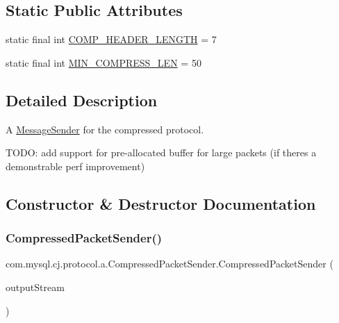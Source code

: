 \subsection*{Static Public Attributes}
\begin{DoxyCompactItemize}
\item 
static final int \mbox{\hyperlink{classcom_1_1mysql_1_1cj_1_1protocol_1_1a_1_1_compressed_packet_sender_af23eba021b7b5002ef05f27bba7733e8}{C\+O\+M\+P\+\_\+\+H\+E\+A\+D\+E\+R\+\_\+\+L\+E\+N\+G\+TH}} = 7
\item 
static final int \mbox{\hyperlink{classcom_1_1mysql_1_1cj_1_1protocol_1_1a_1_1_compressed_packet_sender_a5db21027c99a6cb911a6a286d291a326}{M\+I\+N\+\_\+\+C\+O\+M\+P\+R\+E\+S\+S\+\_\+\+L\+EN}} = 50
\end{DoxyCompactItemize}


\subsection{Detailed Description}
A \mbox{\hyperlink{interfacecom_1_1mysql_1_1cj_1_1protocol_1_1_message_sender}{Message\+Sender}} for the compressed protocol.

T\+O\+DO\+: add support for pre-\/allocated buffer for large packets (if there\textquotesingle{}s a demonstrable perf improvement) 

\subsection{Constructor \& Destructor Documentation}
\mbox{\label{classcom_1_1mysql_1_1cj_1_1protocol_1_1a_1_1_compressed_packet_sender_ab6d47e91936124c65c9c980ed73af907}} 
\subsubsection{\texorpdfstring{Compressed\+Packet\+Sender()}{CompressedPacketSender()}}
{\footnotesize\ttfamily com.\+mysql.\+cj.\+protocol.\+a.\+Compressed\+Packet\+Sender.\+Compressed\+Packet\+Sender (\begin{DoxyParamCaption}\item[{Buffered\+Output\+Stream}]{output\+Stream }\end{DoxyParamCaption})}



